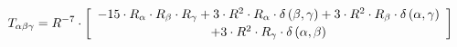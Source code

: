 \begin{subequations}\begin{gather}
T_{\alpha{}\beta{}\gamma{}} = R^{-7} \cdot  \left[ \begin{array}{c} 
 		- 15 \cdot R_{\alpha{}} \cdot R_{\beta{}} \cdot R_{\gamma{}}+ 3 \cdot R^{2} \cdot R_{\alpha{}} \cdot \delta{}\left(\beta{}, \gamma{}\right)+ 3 \cdot R^{2} \cdot R_{\beta{}} \cdot \delta{}\left(\alpha{}, \gamma{}\right) 
 \\[0.2em] \notag 		 + 3 \cdot R^{2} \cdot R_{\gamma{}} \cdot \delta{}\left(\alpha{}, \beta{}\right)
 \end{array}\right] 
\end{gather}\end{subequations}